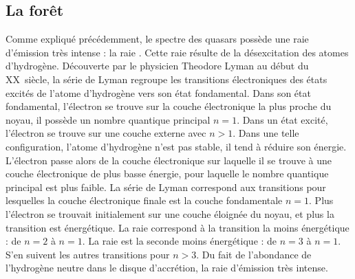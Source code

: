 \subsection{La forêt \lya{}}
\label{subsec:lya}
Comme expliqué précédemment, le spectre des quasars possède une raie d'émission très intense : la raie \lya{}. Cette raie résulte de la désexcitation des atomes d'hydrogène. Découverte par le physicien Theodore Lyman au début du \textsc{XX}\ieme~siècle, la série de Lyman regroupe les transitions électroniques des états excités de l'atome d'hydrogène vers son état fondamental. Dans son état fondamental, l'électron se trouve sur la couche électronique la plus proche du noyau, il possède un nombre quantique principal $n=1$. Dans un état excité, l'électron se trouve sur une couche externe avec $n > 1$. Dans une telle configuration, l'atome d'hydrogène n'est pas stable, il tend à réduire son énergie. L'électron passe alors de la couche électronique sur laquelle il se trouve à une couche électronique de plus basse énergie, pour laquelle le nombre quantique principal est plus faible. La série de Lyman correspond aux transitions pour lesquelles la couche électronique finale est la couche fondamentale $n=1$. Plus l'électron se trouvait initialement sur une couche éloignée du noyau, et plus la transition est énergétique. La raie \lya{} correspond à la transition la moins énergétique : de $n=2$ à $n=1$. La raie \lyb{} est la seconde moins énergétique : de $n=3$ à $n=1$. S'en suivent les autres transitions pour $n > 3$.
Du fait de l'abondance de l'hydrogène neutre dans le disque d'accrétion, la raie d'émission \lya{} très intense.

